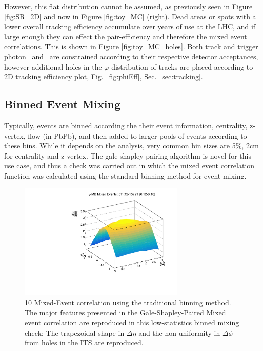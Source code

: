 However, this flat distribution cannot be assumed, as previously seen in Figure \ref{fig:SR_2D} and now in Figure \ref{fig:toy_MC} (right). Dead areas or spots with a lower overall tracking efficiency accumulate over years of use at the LHC, and if large enough they can effect the pair-efficiency and therefore the mixed event correlations. This is shown in Figure \ref{fig:toy_MC_holes}. Both track and trigger photon \deltaeta~and \deltaphi~are constrained according to their respective detector acceptances, however additional holes in the $\varphi$ distribution of tracks are placed according to 2D tracking efficiency plot, Fig.~\ref{fig:phiEff}, Sec.~\ref{sec:tracking}.

\subsection{Binned Event Mixing}

Typically, events are binned according the their event information, centrality, z-vertex, flow (in PbPb), and then added to larger pools of events according to these bins. While it depends on the analysis, very common bin sizes are 5\%, 2cm for centrality and z-vertex. The gale-shapley pairing algorithm is novel for this use case, and thus a check was carried out in which the mixed event  correlation function was calculated using the standard binning method for event mixing.
\begin{figure}[htpb]
\center
\includegraphics[width=0.7\textwidth]{Data_Analysis/EventMixing/2D_Bin_Corr.pdf}%
\caption{10 Mixed-Event correlation using the traditional binning method. The major features presented in the Gale-Shapley-Paired Mixed event correlation are reproduced in this low-statistics binned mixing check; The trapezoidal shape in $\Delta\eta$ and the non-uniformity in $\Delta\phi$ from holes in the ITS are reproduced.}
\label{BIN_Mixed_2D}
\end{figure}
\FloatBarrier

